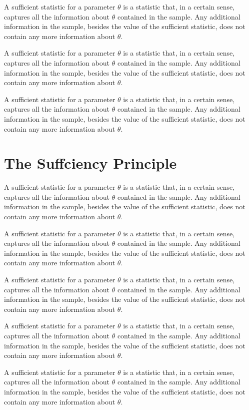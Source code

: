 A sufficient statistic for a parameter $\theta$ is a statistic that, in a certain sense, captures all the information about $\theta$ contained in the sample. Any additional information in the sample, besides the value of the sufficient statistic, does not contain any more information about $\theta$.

A sufficient statistic for a parameter $\theta$ is a statistic that, in a certain sense, captures all the information about $\theta$ contained in the sample. Any additional information in the sample, besides the value of the sufficient statistic, does not contain any more information about $\theta$.

A sufficient statistic for a parameter $\theta$ is a statistic that, in a certain sense, captures all the information about $\theta$ contained in the sample. Any additional information in the sample, besides the value of the sufficient statistic, does not contain any more information about $\theta$.
\section{The Suffciency Principle}

A sufficient statistic for a parameter $\theta$ is a statistic that, in a certain sense, captures all the information about $\theta$ contained in the sample. Any additional information in the sample, besides the value of the sufficient statistic, does not contain any more information about $\theta$.

A sufficient statistic for a parameter $\theta$ is a statistic that, in a certain sense, captures all the information about $\theta$ contained in the sample. Any additional information in the sample, besides the value of the sufficient statistic, does not contain any more information about $\theta$.

A sufficient statistic for a parameter $\theta$ is a statistic that, in a certain sense, captures all the information about $\theta$ contained in the sample. Any additional information in the sample, besides the value of the sufficient statistic, does not contain any more information about $\theta$.

A sufficient statistic for a parameter $\theta$ is a statistic that, in a certain sense, captures all the information about $\theta$ contained in the sample. Any additional information in the sample, besides the value of the sufficient statistic, does not contain any more information about $\theta$.

A sufficient statistic for a parameter $\theta$ is a statistic that, in a certain sense, captures all the information about $\theta$ contained in the sample. Any additional information in the sample, besides the value of the sufficient statistic, does not contain any more information about $\theta$.

